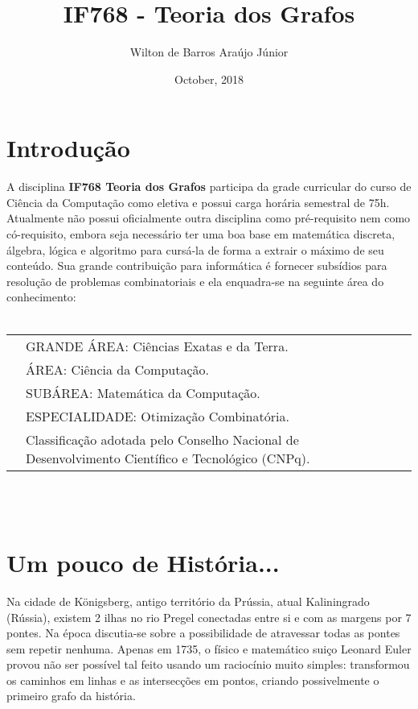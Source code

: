 \documentclass[10pt]{article}
\title{IF768 - Teoria dos Grafos}
\author{Wilton de Barros Araújo Júnior}
\date{October, 2018}
\begin{document}
\maketitle

\section{Introdução}
A disciplina \textbf{IF768 Teoria dos Grafos} participa da grade curricular do curso de Ciência da Computação como eletiva e possui carga horária semestral de 75h. Atualmente não possui oficialmente outra disciplina como pré-requisito nem como có-requisito, embora seja necessário ter uma boa base em matemática discreta, álgebra, lógica e algoritmo para cursá-la de forma a extrair o máximo de seu conteúdo. Sua grande contribuição para informática é fornecer subsídios para resolução de problemas combinatoriais e ela enquadra-se na seguinte área do conhecimento:\\
\\
\begin{tabular}{l l l|l}
     & GRANDE ÁREA: Ciências Exatas e da Terra.\\
     & ÁREA: Ciência da Computação.\\
     & SUBÁREA: Matemática da Computação.\\
     & ESPECIALIDADE: Otimização Combinatória.\\
     & \footnotesize{Classificação adotada pelo Conselho Nacional de Desenvolvimento Científico e Tecnológico (CNPq).}\\
\end{tabular}
\\
\\

\section{Um pouco de História...}
Na cidade de Königsberg, antigo território da Prússia, atual Kaliningrado (Rússia), existem 2 ilhas no rio Pregel conectadas entre si e com as margens por 7 pontes. Na época discutia-se sobre a possibilidade de atravessar todas as pontes sem repetir nenhuma. Apenas em 1735, o físico e matemático suiço Leonard Euler provou não ser possível tal feito usando um raciocínio muito simples: transformou os caminhos em linhas e as intersecções em pontos, criando possivelmente o primeiro grafo da história.
\\
\end{document}

